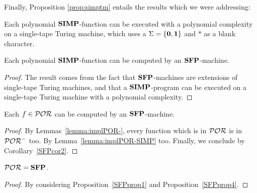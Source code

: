 Finally, Proposition \ref{prop:simptm} entails
the results which we were addressing:

\begin{cor}
Each polynomial $\mathbf{SIMP}$-function
can be executed
with a polynomial complexity
on a single-tape Turing machine,
which uses a {$\Sigma=\{\mathbf{0},\mathbf{1}\}$}
and $*$ as a blank character.
\end{cor}



\begin{cor}\label{SFPcor2}
Each polynomial $\mathbf{SIMP}$-function
can be computed by {an $\mathbf{SFP}$-machine}.
\end{cor}
\begin{proof}
The result comes from the fact that
$\mathbf{SFP}$-machines are extensions of
single-tape Turing machines,
and that a $\mathbf{SIMP}$-program can be executed
on a single-tape Turing {machine}
with a polynomial complexity.
\end{proof}



\begin{prop}\label{SFPprop4}
Each $f\in \mathcal{POR}$ can be computed by {an
$\mathbf{SFP}$-machine}.
\end{prop}

\begin{proof}
By Lemmas~\ref{lemma:implPOR-},
every function which is in $\mathcal{POR}$ is in
$\mathcal{POR}^-$ too.
By Lemma~\ref{lemma:implPOR-SIMP} too.
Finally, we conclude by Corollary~\ref{SFPcor2}.
\end{proof}





\begin{theorem}
$\mathcal{POR}=\mathbf{SFP}$.
\end{theorem}
\begin{proof}
By considering Proposition~\ref{SFPprop1} and
Proposition~\ref{SFPprop4}.
\end{proof}
